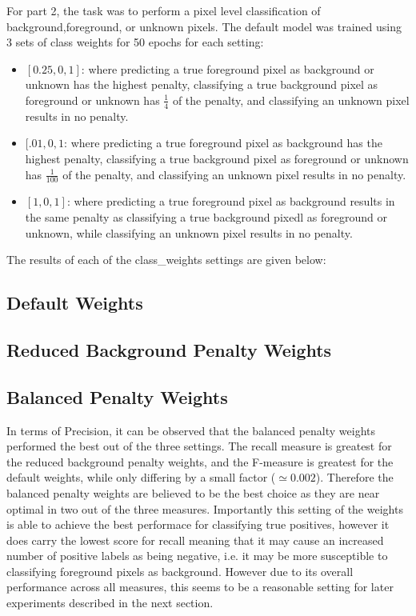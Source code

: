 \documentclass{article}
\begin{document}
For part 2, the task was to perform a pixel level classification of background,foreground, or unknown pixels. The default model was trained using 3 sets of class weights for 50 epochs for each setting:
\begin{itemize}
	\item $[0.25,0,1]$: where predicting a true foreground pixel as background or unknown has the highest penalty, classifying a true background pixel as foreground or unknown has $\frac{1}{4}$ of the penalty, and classifying an unknown pixel results in no penalty.
	\item $[.01,0,1$: where predicting a true foreground pixel as background has the highest penalty, classifying a true background pixel as foreground or unknown has $\frac{1}{100}$ of the penalty, and classifying an unknown pixel results in no penalty. 
	\item $[1,0,1]$: where predicting a true foreground pixel as background results in the same penalty as classifying a true background pixedl as foreground or unknown, while classifying an unknown pixel results in no penalty.
	\end{itemize}

	The results of each of the class\_weights settings are given below:
	\subsection*{Default Weights}
		

	\subsection*{Reduced Background Penalty Weights}
		


	\subsection*{Balanced Penalty Weights}
		

In terms of Precision, it can be observed that the balanced penalty weights performed the best out of the three settings. The recall measure is greatest for the reduced background penalty weights, and the F-measure is greatest for the default weights, while only differing by a small factor ($\simeq 0.002$). Therefore the balanced penalty weights are believed to be the best choice as they are near optimal in two out of the three measures. Importantly this setting of the weights is able to achieve the best performace for classifying true positives, however it does carry the lowest score for recall meaning that it may cause an increased number of positive labels as being negative, i.e. it may be more susceptible to classifying foreground pixels as background. However due to its overall performance across all measures, this seems to be a reasonable setting for later experiments described in the next section.
\end{document}
